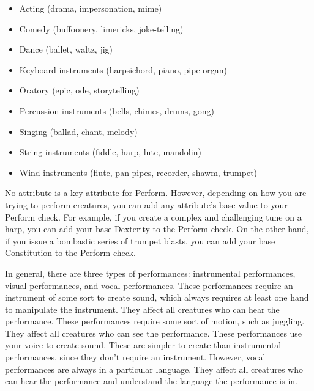         \begin{itemize}
            \item Acting (drama, impersonation, mime)
            \item Comedy (buffoonery, limericks, joke-telling)
            \item Dance (ballet, waltz, jig)
            \item Keyboard instruments (harpsichord, piano, pipe organ)
            \item Oratory (epic, ode, storytelling)
            \item Percussion instruments (bells, chimes, drums, gong)
            \item Singing (ballad, chant, melody)
            \item String instruments (fiddle, harp, lute, mandolin)
            \item Wind instruments (flute, pan pipes, recorder, shawm, trumpet)
        \end{itemize}

        No attribute is a key attribute for Perform.
        However, depending on how you are trying to perform creatures, you can add any attribute's base value to your Perform check.
        For example, if you create a complex and challenging tune on a harp, you can add your base Dexterity to the Perform check.
        On the other hand, if you issue a bombastic series of trumpet blasts, you can add your base Constitution to the Perform check.

        In general, there are three types of performances: instrumental performances, visual performances, and vocal performances.
         These performances require an instrument of some sort to create sound, which always requires at least one hand to manipulate the instrument.
        They affect all creatures who can hear the performance.
         These performances require some sort of motion, such as juggling.
        They affect all creatures who can see the performance.
         These performances use your voice to create sound.
        These are simpler to create than instrumental performances, since they don't require an instrument.
        However, vocal performances are always in a particular language.
        They affect all creatures who can hear the performance and understand the language the performance is in.

